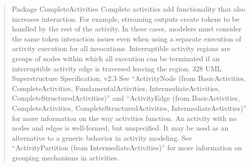 \begin{quotation}
Package CompleteActivities
Complete activities add functionality that also increases interaction. For example, streaming outputs create tokens to be
handled by the rest of the activity. In these cases, modelers must consider the same token interaction issues even when
using a separate execution of activity execution for all invocations.
Interruptible activity regions are groups of nodes within which all execution can be terminated if an interruptible activity
edge is traversed leaving the region.
328
UML Superstructure Specification, v2.3
See “ActivityNode (from BasicActivities, CompleteActivities, FundamentalActivities, IntermediateActivities,
CompleteStructuredActivities)” and “ActivityEdge (from BasicActivities, CompleteActivities,
CompleteStructuredActivities, IntermediateActivities)” for more information on the way activities function. An activity
with no nodes and edges is well-formed, but unspecified. It may be used as an alternative to a generic behavior in activity
modeling. See “ActivityPartition (from IntermediateActivities)” for more information on grouping mechanisms in
activities.

\end{quotation}
